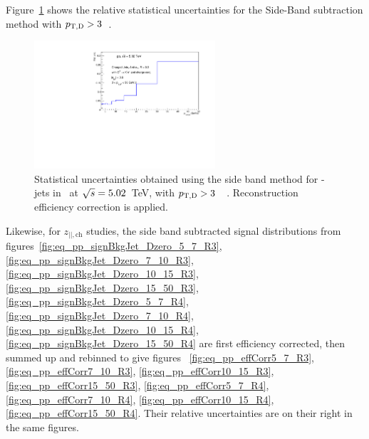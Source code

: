 Figure~\ref{fig:JetPt_pPb_SBUnc_Dzero} shows the relative statistical uncertainties for the Side-Band subtraction method with $p_{\mathrm{T,D}}>3$~\GeVc. %

\begin{figure}[bth]
\centering
\includegraphics[width=0.6\textwidth]{pPbcuts_2sig/jetPtSpectrumUnc_SB_Rebin_pTD3}
\caption{Statistical uncertainties obtained using the side band method for \Dzero-jets in \pp\ at $\sqrt{s}=5.02$~TeV, with $p_{\mathrm{T,D}}>3$~\GeVc\ . Reconstruction efficiency correction is applied.}
\label{fig:JetPt_pPb_SBUnc_Dzero}
\end{figure}


Likewise, for $z_{||,\text{ch}}$ studies, the side band subtracted signal distributions from 
figures~\ref{fig:eq_pp_signBkgJet_Dzero_5_7_R3}, \ref{fig:eq_pp_signBkgJet_Dzero_7_10_R3}, \ref{fig:eq_pp_signBkgJet_Dzero_10_15_R3}, \ref{fig:eq_pp_signBkgJet_Dzero_15_50_R3}, \ref{fig:eq_pp_signBkgJet_Dzero_5_7_R4}, \ref{fig:eq_pp_signBkgJet_Dzero_7_10_R4}, \ref{fig:eq_pp_signBkgJet_Dzero_10_15_R4}, \ref{fig:eq_pp_signBkgJet_Dzero_15_50_R4} 
are first efficiency corrected, then summed up and rebinned to give figures~
\ref{fig:eq_pp_effCorr5_7_R3}, \ref{fig:eq_pp_effCorr7_10_R3}, \ref{fig:eq_pp_effCorr10_15_R3}, \ref{fig:eq_pp_effCorr15_50_R3}, 
\ref{fig:eq_pp_effCorr5_7_R4}, \ref{fig:eq_pp_effCorr7_10_R4}, \ref{fig:eq_pp_effCorr10_15_R4}, \ref{fig:eq_pp_effCorr15_50_R4}. 
Their relative uncertainties are on their right in the same figures.

